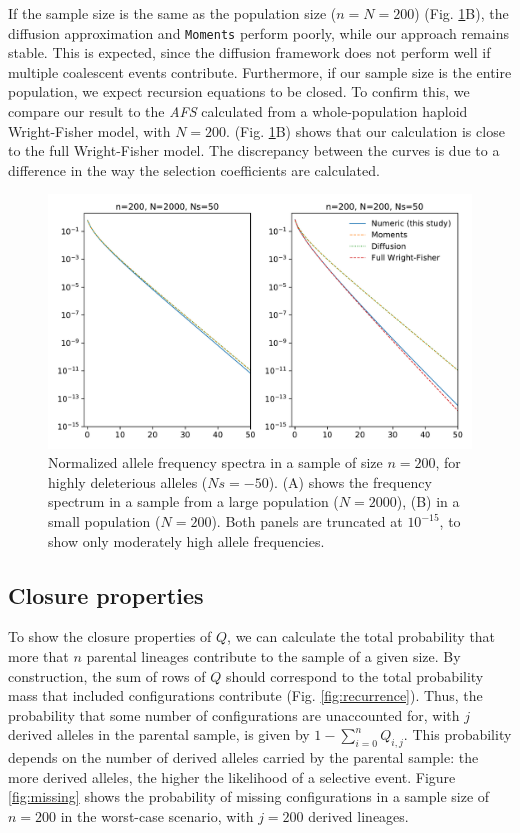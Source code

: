 \documentclass[review]{elsarticle}
\begin{document}
If the sample size is the same as the population size ($n=N=200$) (Fig.
\ref{fig:strong-selection}B), the diffusion approximation and \texttt{Moments} perform poorly, while
our approach remains stable. This is expected, since the diffusion framework does not perform well
if multiple coalescent events contribute. Furthermore, if our sample size is the entire population,
we expect recursion equations to be closed. To confirm this, we compare our result to the
\textit{AFS} calculated from a whole-population haploid Wright-Fisher model, with $N=200$. (Fig.
\ref{fig:strong-selection}B) shows that our calculation is close to the full Wright-Fisher model.
The discrepancy between the curves is due to a difference in the way the selection coefficients are
calculated.

\begin{figure}
  \centering
  \includegraphics[width=0.7\textheight]{fig/strong_selection.pdf}
  \caption{Normalized allele frequency spectra in a sample of size $n=200$, for highly deleterious
    alleles ($Ns=-50$). (A) shows the frequency spectrum in a sample from a large population
    ($N=2000$), (B) in a small population ($N=200$). Both panels are truncated at $10^{-15}$, to
    show only moderately high allele frequencies.}
  \label{fig:strong-selection}
\end{figure}


\subsection{Closure properties}
\label{subsec:closure}

To show the closure properties of $Q$, we can calculate the total probability that more that $n$
parental lineages contribute to the sample of a given size. By construction, the sum of rows of $Q$
should correspond to the total probability mass that included configurations contribute (Fig.
\ref{fig:recurrence}). Thus, the probability that some number of configurations are unaccounted for,
with $j$ derived alleles in the parental sample, is given by $1-\sum_{i=0}^{n}Q_{i,j}$.
This probability depends on the number of derived alleles carried by the parental sample: the more
derived alleles, the higher the likelihood of a selective event. Figure \ref{fig:missing} shows the
probability of missing configurations in a sample size of $n=200$ in the worst-case scenario, with
$j=200$ derived lineages.
\end{document}
